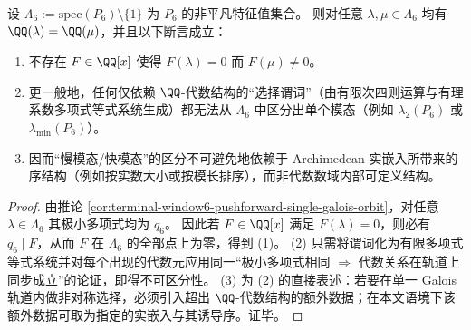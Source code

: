 \begin{proposition}[慢模态与快模态在纯代数层面不可区分]\label{prop:terminal-window6-pushforward-no-algebraic-mode-selection}
设 \(\Lambda_6:=\mathrm{spec}(P_6)\setminus\{1\}\) 为 \(P_6\) 的非平凡特征值集合。
则对任意 \(\lambda,\mu\in\Lambda_6\) 均有 \(\QQ(\lambda)=\QQ(\mu)\)，并且以下断言成立：
\begin{enumerate}
  \item 不存在 \(F\in\QQ[x]\) 使得 \(F(\lambda)=0\) 而 \(F(\mu)\neq 0\)。
  \item 更一般地，任何仅依赖 \(\QQ\)-代数结构的“选择谓词”（由有限次四则运算与有理系数多项式等式系统生成）都无法从 \(\Lambda_6\) 中区分出单个模态（例如 \(\lambda_2(P_6)\) 或 \(\lambda_{\min}(P_6)\)）。
  \item 因而“慢模态/快模态”的区分不可避免地依赖于 Archimedean 实嵌入所带来的序结构（例如按实数大小或按模长排序），而非代数数域内部可定义结构。
\end{enumerate}
\end{proposition}
\begin{proof}
由推论 \ref{cor:terminal-window6-pushforward-single-galois-orbit}，对任意 \(\lambda\in\Lambda_6\) 其极小多项式均为 \(q_6\)。
因此若 \(F\in\QQ[x]\) 满足 \(F(\lambda)=0\)，则必有 \(q_6\mid F\)，从而 \(F\) 在 \(\Lambda_6\) 的全部点上为零，得到 (1)。
(2) 只需将谓词化为有限多项式等式系统并对每个出现的代数元应用同一“极小多项式相同 \(\Rightarrow\) 代数关系在轨道上同步成立”的论证，即得不可区分性。
(3) 为 (2) 的直接表述：若要在单一 Galois 轨道内做非对称选择，必须引入超出 \(\QQ\)-代数结构的额外数据；在本文语境下该额外数据可取为指定的实嵌入与其诱导序。证毕。
\end{proof}

